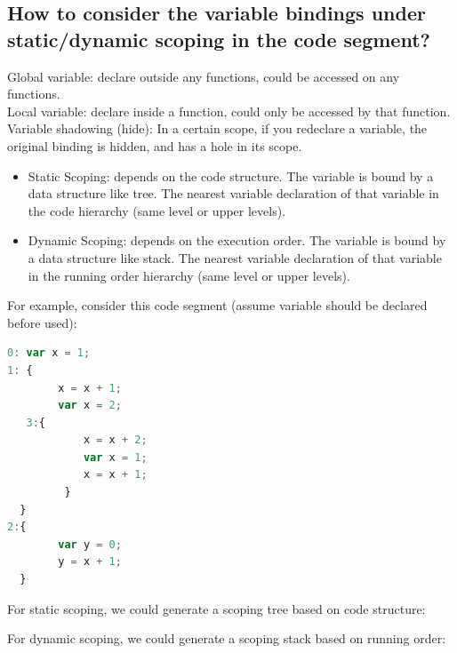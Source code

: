 \documentclass[11pt]{article}
\begin{document}
\subsection{How to consider the variable bindings under static/dynamic scoping in the code segment?}
Global variable: declare outside any functions, could be accessed on any functions.\\
Local variable: declare inside a function, could only be accessed by that function.\\
Variable shadowing (hide): In a certain scope, if you redeclare a variable, the original binding is hidden, and has a hole in its scope.\\
\begin{itemize}
\item Static Scoping: depends on the code structure. The variable is bound by a data structure like tree. The nearest variable declaration of that variable in the code hierarchy (same level or upper levels).
\item Dynamic Scoping: depends on the execution order. The variable is bound by a data structure like stack. The nearest variable declaration of that variable in the running order hierarchy (same level or upper levels).
\end{itemize}
For example, consider this code segment (assume variable should be declared before used):
\begin{lstlisting}[mathescape, language=JavaScript]
0: var x = 1;
1: {
		x = x + 1;
		var x = 2;
   3:{
 			x = x + 2;
 			var x = 1;
 			x = x + 1;
		 }
  }
2:{
		var y = 0;
		y = x + 1;
  }
\end{lstlisting}
For static scoping, we could generate a scoping tree based on code structure:
\begin{center}
\end{center}
For dynamic scoping, we could generate a scoping stack based on running order:
\end{document}
